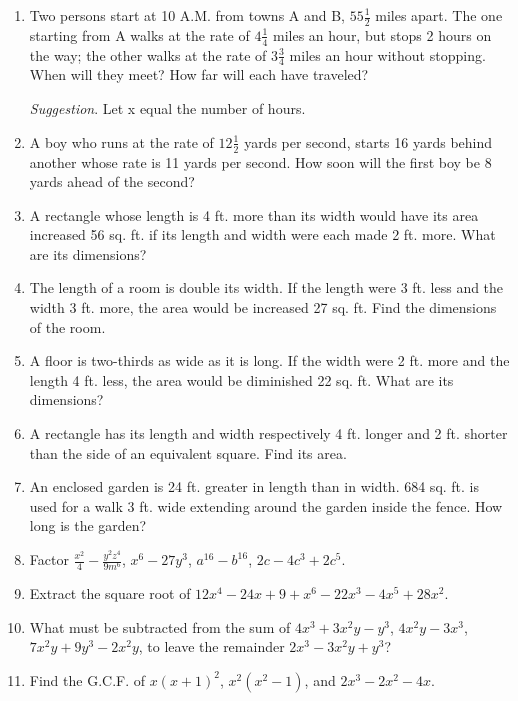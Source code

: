 \documentclass{book}
\begin{document}
\begin{enumerate}
\item Two persons start at 10 A.M. from towns A and B,
$55\frac{1}{2}$ miles apart. The one starting from A walks at the
rate of $4\frac{1}{4}$ miles an hour, but stops 2 hours on the way;
the other walks at the rate of $3\frac{3}{4}$ miles an hour without
stopping. When will they meet? How far will each
have traveled?

\textit{ Suggestion}. Let x equal the number of hours.

\item A boy who runs at the rate of $12\frac{1}{2}$ yards per second,
starts 16 yards behind another whose rate is 11 yards per
second. How soon will the first boy be 8 yards ahead of
the second?

\item A rectangle whose length is 4 ft. more than its
width would have its area increased 56 sq. ft. if its length
and width were each made 2 ft. more. What are its
dimensions?

\item The length of a room is double its width. If the
length were 3 ft. less and the width 3 ft. more, the area
would be increased 27 sq. ft. Find the dimensions of the
room.

\item A floor is two-thirds as wide as it is long. If the
width were 2 ft. more and the length 4 ft. less, the area
would be diminished 22 sq. ft. What are its dimensions?

\item A rectangle has its length and width respectively
4 ft. longer and 2 ft. shorter than the side of an equivalent
square. Find its area.

\item An enclosed garden is 24 ft. greater in length than in
width. 684 sq. ft. is used for a walk 3 ft. wide extending
around the garden inside the fence. How long is the
garden?

\item Factor $\displaystyle \frac{x^2}{4}-\frac{y^2z^4}{9m^6}$,
$x^6-27y^3$, $a^{16}-b^{16}$, $2c-4c^3+2c^5$.

\item Extract the square root of $12x^4-24x+9+x^6-22x^3-4x^5+28x^2$.

\item What must be subtracted from the sum of
$4x^3+3x^2y-y^3$, $4x^2y-3x^3$, $7x^2y+9y^3-2x^2y$, to leave the remainder
$2x^3-3x^2y+y^3$?

\item Find the G.C.F. of $x\left(x+1\right)^2$, $x^2(x^2-1)$, and
$2x^3-2x^2-4x$.


\end{enumerate}
\end{document}
